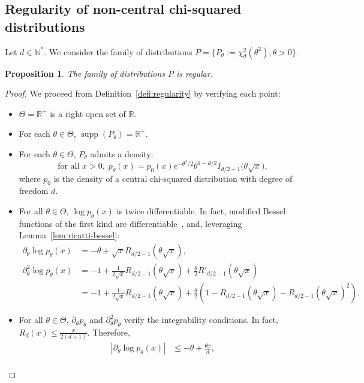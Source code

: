 \documentclass{article}
\theoremstyle{plain}
\newtheorem{proposition}{Proposition}[section]
\theoremstyle{definition}
\theoremstyle{remark}
\DeclareMathOperator{\supp}{supp}
\begin{document}
\subsection{Regularity of non-central chi-squared distributions}

Let $d \in \mathbb{N}^*$. We consider the family of distributions $P = \{P_\theta := \chi_d^2(\theta^2), \theta > 0\}$.

\begin{proposition}
\label{prop:regularity-chi2}
    The family of distributions $P$ is regular.
\end{proposition}

\begin{proof}
    We proceed from Definition~\ref{defi:regularity} by verifying each point:
    \begin{itemize}
        \item $\Theta = \mathbb{R}^+$ is a right-open set of $\mathbb{R}$.
        \item For each $\theta \in \Theta$, $\supp(P_\theta) = \mathbb{R}^+$.
        \item For each $\theta \in \Theta$, $P_\theta$ admits a density: \[\text{for all }x > 0,\; p_\theta(x) = p_0(x) e^{- \theta^2/2} \theta^{1-d/2}  I_{d/2-1}\big(\theta\sqrt{x}\big),\]
        where $p_0$ is the density of a central chi-squared distribution with degree of freedom $d$.
        \item For all $\theta \in \Theta$, $\log p_\theta(x)$ is twice differentiable. In fact, modified Bessel functions of the first kind are differentiable~\citep{Arfken2011}, and, leveraging Lemma~\ref{lem:ricatti-bessel}:
        \begin{align*}
            \partial_\theta \log p_\theta(x)  &=  - \theta + \sqrt{x} R_{d/2-1}(\theta\sqrt{x}),\\
            \partial_\theta^2 \log p_\theta(x)  &=  - 1 + \frac{1}{2\sqrt{x}} R_{d/2-1}(\theta\sqrt{x}) + \frac{\theta}{2}R'_{d/2-1}(\theta\sqrt{x})\\
            &=- 1 + \frac{1}{2\sqrt{x}} R_{d/2-1}(\theta\sqrt{x}) + \frac{\theta}{2} ( 1 - R_{d/2-1}(\theta\sqrt{x}) - R_{d/2-1}(\theta\sqrt{x})^2). 
        \end{align*}
        \item For all $\theta \in \Theta$, $\partial_\theta p_\theta$ and $\partial_\theta^2 p_\theta$ verify the integrability conditions. In fact, $R_d(x) \leq \frac{x}{2(d+1)}$.
        Therefore,
        \begin{align*}
            |\partial_\theta \log p_\theta(x)|  &\leq  - \theta + \frac{\theta x}{d},\\

\end{align*}
\end{itemize}
\end{proof}
\end{document}
